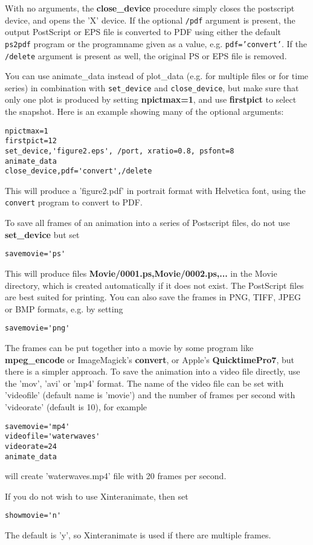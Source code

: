 \documentclass{article}
\begin{document}
With no arguments, the {\bf close\_device} procedure
simply closes the postscript device, and opens the 'X' device.
If the optional {\tt /pdf} argument is present, the output PostScript or EPS
file is converted to PDF using either the default {\tt ps2pdf} program 
or the programname given as a value, e.g. {\tt pdf='convert'}.
If the {\tt /delete} argument is present as well, the original PS or EPS file
is removed. 

You can use animate\_data instead of plot\_data (e.g. for multiple files or 
for time series) in combination with {\tt set\_device} and 
{\tt close\_device}, but make sure that only one plot is produced by setting
{\bf npictmax=1}, and use {\bf firstpict} to select the snapshot.
Here is an example showing many of the optional arguments:
\begin{verbatim}
npictmax=1
firstpict=12
set_device,'figure2.eps', /port, xratio=0.8, psfont=8
animate_data
close_device,pdf='convert',/delete
\end{verbatim}
This will produce a 'figure2.pdf' in portrait format with Helvetica font,
using the {\tt convert} program to convert to PDF.

To save all frames of an animation into a series of Postscript files, 
do not use {\bf set\_device} but set
\begin{verbatim}
savemovie='ps'
\end{verbatim}
This will produce files {\bf Movie/0001.ps,Movie/0002.ps,...} 
in the Movie directory, which is created automatically if it does
not exist. The PostScript files are best suited for printing.
You can also save the frames in PNG, TIFF, JPEG or BMP formats, e.g.
by setting 
\begin{verbatim}
savemovie='png'
\end{verbatim}
The frames can be put together into a movie by some program like
{\bf mpeg\_encode} or ImageMagick's {\bf convert}, or 
Apple's {\bf QuicktimePro7}, but there is a simpler approach.
To save the animation into a video file directly, 
use the 'mov', 'avi' or 'mp4' format. The name of the video file
can be set with 'videofile' (default name is 'movie') 
and the number of frames per second with 'videorate' (default is 10), 
for example
\begin{verbatim}
savemovie='mp4'
videofile='waterwaves'
videorate=24
animate_data
\end{verbatim}
will create 'waterwaves.mp4' file with 20 frames per second.

If you do not wish to use Xinteranimate, then set
\begin{verbatim}
showmovie='n'
\end{verbatim}
The default is 'y', so Xinteranimate is used if there are multiple frames.
\end{document}
